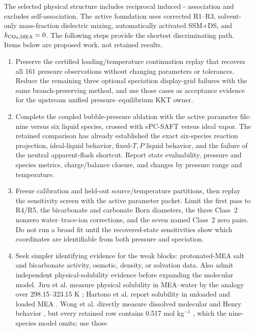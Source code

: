 \documentclass[10pt,oneside]{scrartcl}
\begin{document}
The selected physical structure includes reciprocal induced
- association and excludes  self-association. The
active foundation uses corrected R1--R3, solvent-only mass-fraction dielectric
mixing, automatically activated SSM+DS,
and $k_{\ce{CO2},\mathrm{MEA}}=0$. The following
steps provide the shortest discriminating path. Items below are proposed work,
not retained results.

\begin{enumerate}
\item Preserve the certified loading/temperature continuation replay that
recovers all 161 pressure observations without changing parameters or
tolerances. Reduce the remaining three optional speciation display-grid
failures with the same branch-preserving method, and use those cases as
acceptance evidence for the upstream unified pressure--equilibrium KKT owner.
\item Complete the coupled bubble-pressure ablation with the active
parameter file: nine versus six liquid species, crossed with ePC-SAFT versus
ideal vapor. The retained comparison has already established the exact
six-species reaction projection, ideal-liquid behavior, fixed-$T,P$ liquid
behavior, and the failure of the neutral apparent-flash shortcut. Report state
evaluability, pressure and species metrics, charge/balance closure, and changes
by pressure range and temperature.
\item Freeze calibration and held-out source/temperature partitions, then
replay the sensitivity screen with the active parameter packet. Limit the
first pass to R4/R5, the bicarbonate and carbonate Born diameters, the three
Class~2 nonzero water--trace-ion corrections, and the seven named Class~2 zero
pairs. Do not run a broad fit until the recovered-state sensitivities show
which coordinates are identifiable from both pressure and speciation.
\item Seek simpler identifying evidence for the weak blocks: protonated-MEA
salt and bicarbonate activity, osmotic, density, or solvation data. Also admit
independent physical-solubility evidence before expanding the molecular model.
Jiru et al. measure physical  solubility in MEA--water by the
 analogy over 298.15--323.15 K \cite{Jiru2012}; Hartono et al. report
 solubility in unloaded and loaded MEA \cite{Hartono2014}. Wong et al.
directly measure dissolved molecular  and Henry behavior
\cite{wongSituMeasurementPhysical2016}, but every retained row contains
0.517 mol kg$^{-1}$ , which the nine-species model omits; use those

\end{enumerate}
\end{document}
